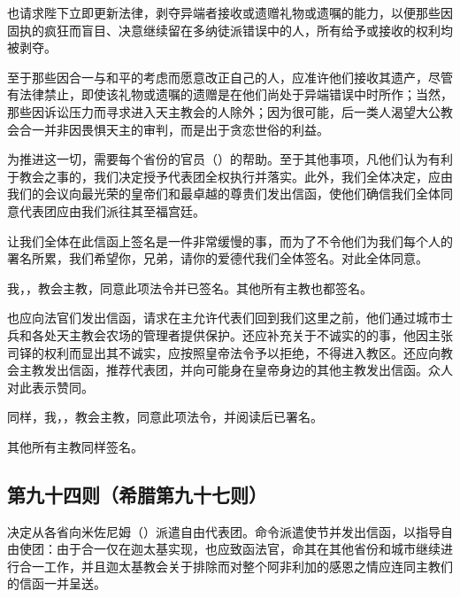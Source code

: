 也请求陛下立即更新法律，剥夺异端者接收或遗赠礼物或遗嘱的能力，以便那些因固执的疯狂而盲目、决意继续留在多纳徒派错误中的人，所有给予或接收的权利均被剥夺。\par

至于那些因合一与和平的考虑而愿意改正自己的人，应准许他们接收其遗产，尽管有法律禁止，即使该礼物或遗嘱的遗赠是在他们尚处于异端错误中时所作；当然，那些因诉讼压力而寻求进入天主教会的人除外；因为很可能，后一类人渴望大公教会合一并非因畏惧天主的审判，而是出于贪恋世俗的利益。\par

为推进这一切，需要每个省份的官员（）的帮助。至于其他事项，凡他们认为有利于教会之事的，我们决定授予代表团全权执行并落实。此外，我们全体决定，应由我们的会议向最光荣的皇帝们和最卓越的尊贵们发出信函，使他们确信我们全体同意代表团应由我们派往其至福宫廷。\par

让我们全体在此信函上签名是一件非常缓慢的事，而为了不令他们为我们每个人的署名所累，我们希望你，兄弟，请你的爱德代我们全体签名。对此全体同意。\par

我，，教会主教，同意此项法令并已签名。其他所有主教也都签名。\par

也应向法官们发出信函，请求在主允许代表们回到我们这里之前，他们通过城市士兵和各处天主教会农场的管理者提供保护。还应补充关于不诚实的的事，他因主张司铎的权利而显出其不诚实，应按照皇帝法令予以拒绝，不得进入教区。还应向教会主教发出信函，推荐代表团，并向可能身在皇帝身边的其他主教发出信函。众人对此表示赞同。\par

同样，我，，教会主教，同意此项法令，并阅读后已署名。\par

其他所有主教同样签名。\par


\subsection{第九十四则（希腊第九十七则）}

\par

决定从各省向米佐尼姆（）派遣自由代表团。命令派遣使节并发出信函，以指导自由使团：由于合一仅在迦太基实现，也应致函法官，命其在其他省份和城市继续进行合一工作，并且迦太基教会关于排除而对整个阿非利加的感恩之情应连同主教们的信函一并呈送。\par


